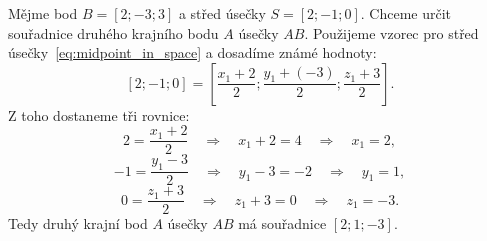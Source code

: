 \begin{example}
    Mějme bod $B = [2;-3;3]$ a střed úsečky $S = [2; -1; 0]$.
    Chceme určit souřadnice druhého krajního bodu $A$ úsečky $AB$.
    Použijeme vzorec pro střed úsečky~\eqref{eq:midpoint_in_space} a dosadíme známé hodnoty:
    \[
    [2; -1; 0] = \left[\frac{x_1 + 2}{2}; \frac{y_1 + (-3)}{2}; \frac{z_1 + 3}{2}\right].
    \]
    Z toho dostaneme tři rovnice:
    \[
    2 = \frac{x_1 + 2}{2} \quad \Rightarrow \quad x_1 + 2 = 4 \quad \Rightarrow \quad x_1 = 2,
    \]
    \[
    -1 = \frac{y_1 - 3}{2} \quad \Rightarrow \quad y_1 - 3 = -2 \quad \Rightarrow \quad y_1 = 1,
    \]
    \[
    0 = \frac{z_1 + 3}{2} \quad \Rightarrow \quad z_1 + 3 = 0 \quad \Rightarrow \quad z_1 = -3.
    \]
    Tedy druhý krajní bod $A$ úsečky $AB$ má souřadnice $[2; 1; -3]$.
\end{example}





